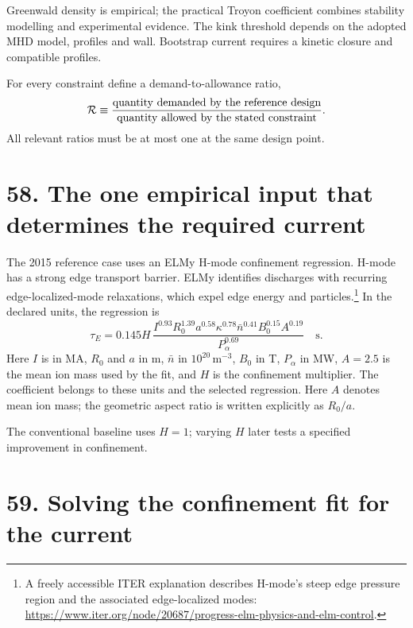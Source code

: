 \documentclass[11pt]{article}
\begin{document}
Greenwald density is empirical; the practical Troyon coefficient combines stability
modelling and experimental evidence. The kink threshold depends on the adopted MHD
model, profiles and wall. Bootstrap current requires a kinetic closure and compatible
profiles.

For every constraint define a demand-to-allowance ratio,
\begin{equation}
 \mathcal R\equiv\frac{\hbox{quantity demanded by the reference design}}
 {\hbox{quantity allowed by the stated constraint}}.
 \label{eq:constraint-ratio}
\end{equation}
All relevant ratios must be at most one at the same design point.

\section*{58. The one empirical input that determines the required current}

The 2015 reference case uses an ELMy H-mode confinement regression. H-mode has a strong edge transport barrier. ELMy identifies discharges with recurring
edge-localized-mode relaxations, which expel edge energy and particles.\footnote{A
freely accessible ITER explanation describes H-mode's steep edge pressure region and
the associated edge-localized modes: \url{https://www.iter.org/node/20687/progress-elm-physics-and-elm-control}.}
In the declared units, the regression is
\begin{equation}
\tau_E =
0.145H\,
\frac{I^{0.93}R_0^{1.39}a^{0.58}\kappa^{0.78}
\bar n^{0.41}B_0^{0.15}A^{0.19}}
{P_\alpha^{0.69}}
\quad\mathrm{s}.
\label{eq:freidberg-confinement}
\end{equation}
Here $I$ is in MA, $R_0$ and $a$ in m, $\bar n$ in
$10^{20}\,\mathrm{m^{-3}}$, $B_0$ in T, $P_\alpha$ in MW, $A=2.5$ is the
mean ion mass used by the fit, and $H$ is the confinement multiplier. The coefficient belongs to these units and the selected regression.
Here $A$ denotes mean ion mass; the geometric aspect ratio is written explicitly as $R_0/a$.


The conventional baseline uses $H=1$; varying $H$ later tests a specified improvement
in confinement.

\section*{59. Solving the confinement fit for the current}
\end{document}

